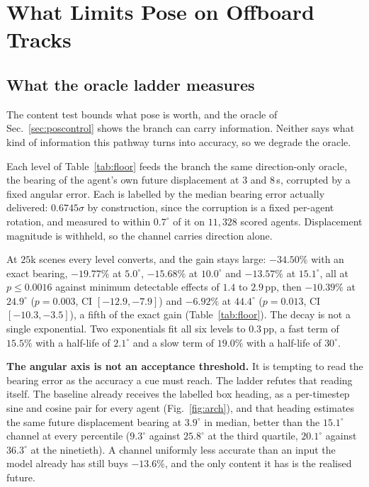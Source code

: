 \documentclass[conference]{IEEEtran}
\begin{document}
\section{What Limits Pose on Offboard Tracks}
\label{sec:why}

\subsection{What the oracle ladder measures}
\label{sec:floor}
The content test bounds what pose is worth, and the oracle of
Sec.~\ref{sec:poscontrol} shows the branch can carry information. Neither says
what kind of information this pathway turns into accuracy, so we degrade
the oracle.

Each level of Table~\ref{tab:floor} feeds the branch the same direction-only
oracle, the bearing of the agent's own future displacement at $3$ and $8$\,s,
corrupted by a fixed angular error. Each is labelled by the median
bearing error actually delivered: $0.6745\sigma$ by construction, since the
corruption is a fixed per-agent rotation, and measured to within $0.7^\circ$ of
it on $11{,}328$ scored agents. Displacement magnitude is withheld, so the
channel carries direction alone.

At $25$k scenes every level converts, and the gain stays large: $-34.50\%$ with an
exact bearing, $-19.77\%$ at $5.0^\circ$, $-15.68\%$ at $10.0^\circ$ and
$-13.57\%$ at $15.1^\circ$, all at $p\le0.0016$ against minimum detectable
effects of $1.4$ to $2.9$\,pp, then $-10.39\%$ at $24.9^\circ$ ($p{=}0.003$, CI
$[-12.9,-7.9]$) and $-6.92\%$ at $44.4^\circ$ ($p{=}0.013$, CI $[-10.3,-3.5]$),
a fifth of the exact gain (Table~\ref{tab:floor}). The decay is not a single
exponential. Two exponentials fit all six levels to $0.3$\,pp, a fast term of
$15.5\%$ with a half-life of $2.1^\circ$ and a slow term of $19.0\%$ with a
half-life of $30^\circ$.

\textbf{The angular axis is not an acceptance threshold.} It is tempting to read
the bearing error as the accuracy a cue must reach. The ladder refutes that reading
itself. The baseline already receives the labelled box heading, as
a per-timestep sine and cosine pair for every agent (Fig.~\ref{fig:arch}), and that
heading estimates the same future displacement bearing at $3.9^\circ$ in
median, better than the $15.1^\circ$ channel at every percentile
($9.3^\circ$ against $25.8^\circ$ at the third quartile, $20.1^\circ$ against
$36.3^\circ$ at the ninetieth). A channel uniformly less accurate than an input
the model already has still buys $-13.6\%$, and the only content it has is the
realised future.
\end{document}
